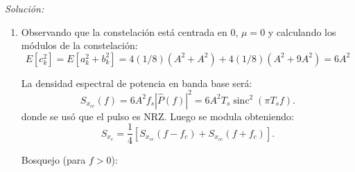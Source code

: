 \documentclass[a4paper,11pt]{article}
\DeclareMathOperator{\sinc}{sinc}
\newenvironment{solucion}[1][]{
\noindent \large \textsl{Solución:} \ifthenelse{\equal{#1}{}}{}{\emph{(#1)}}

\smallskip
}{
\bigskip
}
\begin{document}
\begin{solucion}
\begin{enumerate}
                \item Observando que la constelación está centrada en $0$, $\mu=0$ y calculando los módulos de la constelación:
                      \begin{equation*}
                      E[c_k^2] = E[a_k^2+b_k^2] = 4 (1/8) (A^2 + A^2) + 4 (1/8) (A^2+9A^2) = 6A^2
                      \end{equation*}

                La densidad espectral de potencia en banda base será:
                \begin{equation*}
                        S_{x_{ce}} (f) = 6A^2 f_s |\hat{P}(f)|^2 = 6A^2 T_s \sinc^2(\pi T_s f).
                \end{equation*}
                donde se usó que el pulso es NRZ. Luego se modula obteniendo:
                \begin{equation*}
                        S_{x_c} = \frac{1}{4}\left[S_{x_{ce}}(f-f_c) + S_{x_{ce}}(f+f_c)\right].
                \end{equation*}

                Bosquejo (para $f>0$):
                \begin{center}
\end{center}
\end{enumerate}
\end{solucion}
\end{document}
